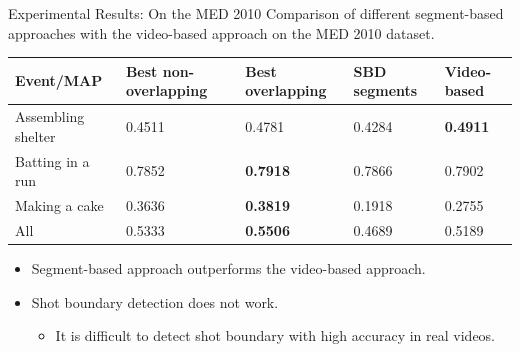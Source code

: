 \documentclass{beamer}
\begin{document}
\begin{frame}[t]{Experimental Results: On the MED 2010}
Comparison of different segment-based approaches with the video-based approach on the MED 2010 dataset.
\begin{table}
\renewcommand{\arraystretch}{1.2}
\footnotesize
\centering
\begin{tabular}{| p{1.9cm} | p{1.9cm} | p{1.9cm} | p{1.9cm} | p{1.9cm} |}
\toprule
Event/MAP & Best non-overlapping & Best overlapping & SBD segments & Video-based\\
\midrule
Assembling shelter & 0.4511 & 0.4781& 0.4284  & \textbf{0.4911} \\
\midrule
Batting in a run & 0.7852 &\textbf{0.7918}& 0.7866 & 0.7902 \\
\midrule
Making a cake & 0.3636 & \textbf{0.3819} & 0.1918 & 0.2755 \\ 
\midrule
All & 0.5333 & \textbf{0.5506} & 0.4689 & 0.5189 \\
\bottomrule
\end{tabular}
\end{table}

\begin{itemize}
\item Segment-based approach outperforms the video-based approach.
\item Shot boundary detection does not work.
\begin{itemize}
	\item It is difficult to detect shot boundary with high accuracy in real videos.
\end{itemize} 
\end{itemize}

\end{frame}
\end{document}

